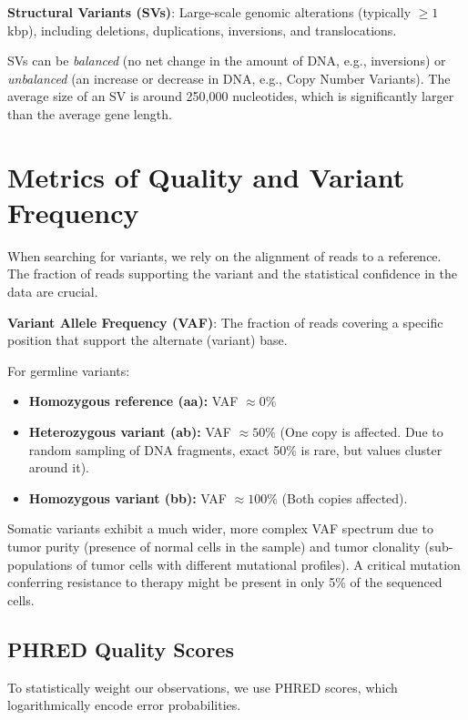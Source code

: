 \documentclass[11pt,a4paper]{article}
\begin{document}
\begin{important}
    \textbf{Structural Variants (SVs)}: Large-scale genomic alterations (typically $\geq 1$ kbp), including deletions, duplications, inversions, and translocations.
\end{important}

SVs can be \textit{balanced} (no net change in the amount of DNA, e.g., inversions) or \textit{unbalanced} (an increase or decrease in DNA, e.g., Copy Number Variants). The average size of an SV is around 250,000 nucleotides, which is significantly larger than the average gene length.

\section{Metrics of Quality and Variant Frequency}

When searching for variants, we rely on the alignment of reads to a reference. The fraction of reads supporting the variant and the statistical confidence in the data are crucial.

\begin{important}
    \textbf{Variant Allele Frequency (VAF)}: The fraction of reads covering a specific position that support the alternate (variant) base.
\end{important}

For germline variants:
\begin{itemize}
    \item \textbf{Homozygous reference (aa):} VAF $\approx 0\%$
    \item \textbf{Heterozygous variant (ab):} VAF $\approx 50\%$ (One copy is affected. Due to random sampling of DNA fragments, exact 50\% is rare, but values cluster around it).
    \item \textbf{Homozygous variant (bb):} VAF $\approx 100\%$ (Both copies affected).
\end{itemize}
Somatic variants exhibit a much wider, more complex VAF spectrum due to tumor purity (presence of normal cells in the sample) and tumor clonality (sub-populations of tumor cells with different mutational profiles). A critical mutation conferring resistance to therapy might be present in only 5\% of the sequenced cells.

\subsection{PHRED Quality Scores}
To statistically weight our observations, we use PHRED scores, which logarithmically encode error probabilities.
\end{document}
